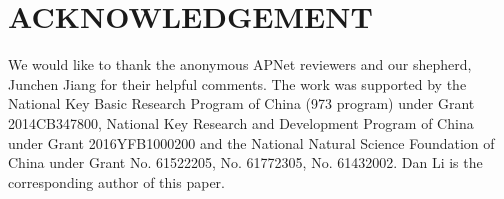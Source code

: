 \documentclass[sigconf,10pt]{acmart}
\begin{document}
\vspace{-0.4cm}
\section*{ACKNOWLEDGEMENT}
We would like to thank the anonymous APNet reviewers and our shepherd, Junchen Jiang for their helpful comments.
The work was supported by the National Key Basic Research Program of China (973 program) under Grant 2014CB347800, National Key Research and Development Program of China under Grant 2016YFB1000200 and the National Natural Science Foundation of China under Grant No. 61522205, No. 61772305, No. 61432002. Dan Li is the corresponding author of this paper.


\begin{small}
	
\end{small}
\label{last-page}
\end{document}
